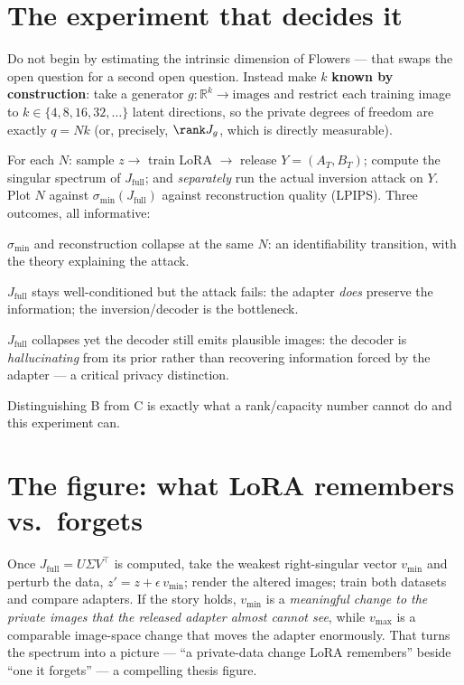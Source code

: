 \section{The experiment that decides it}
Do not begin by estimating the intrinsic dimension of Flowers --- that swaps the open
question for a second open question. Instead make $k$ \textbf{known by construction}:
take a generator $g:\mathbb R^{k}\to\text{images}$ and restrict each training image to
$k\in\{4,8,16,32,\dots\}$ latent directions, so the private degrees of freedom are exactly
$q=Nk$ (or, precisely, $\rank J_g$, which is directly measurable).

For each $N$: sample $z\to$ train LoRA $\to$ release $Y=(A_T,B_T)$; compute the singular
spectrum of $J_{\mathrm{full}}$; and \emph{separately} run the actual inversion attack on
$Y$. Plot $N$ against $\sigma_{\min}(J_{\mathrm{full}})$ against reconstruction quality
(LPIPS). Three outcomes, all informative:
\begin{description}\itemsep2pt
\item[World A (the dream).] $\sigma_{\min}$ and reconstruction collapse at the same $N$:
an identifiability transition, with the theory explaining the attack.
\item[World B.] $J_{\mathrm{full}}$ stays well-conditioned but the attack fails: the
adapter \emph{does} preserve the information; the inversion/decoder is the bottleneck.
\item[World C.] $J_{\mathrm{full}}$ collapses yet the decoder still emits plausible
images: the decoder is \emph{hallucinating} from its prior rather than recovering
information forced by the adapter --- a critical privacy distinction.
\end{description}
Distinguishing B from C is exactly what a rank/capacity number cannot do and this
experiment can.

\section{The figure: what LoRA remembers vs.\ forgets}
Once $J_{\mathrm{full}}=U\Sigma V^{\top}$ is computed, take the weakest right-singular
vector $v_{\min}$ and perturb the data, $z'=z+\epsilon\,v_{\min}$; render the altered
images; train both datasets and compare adapters. If the story holds, $v_{\min}$ is a
\emph{meaningful change to the private images that the released adapter almost cannot
see}, while $v_{\max}$ is a comparable image-space change that moves the adapter
enormously. That turns the spectrum into a picture --- ``a private-data change LoRA
remembers'' beside ``one it forgets'' --- a compelling thesis figure.

